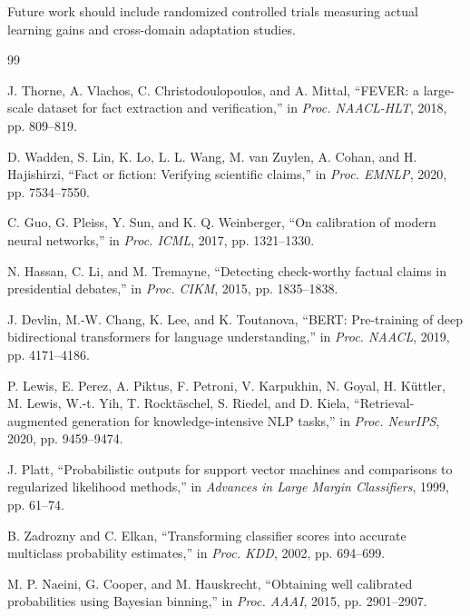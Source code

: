 \documentclass[journal]{IEEEtran}
\begin{document}
Future work should include randomized controlled trials measuring actual learning gains and cross-domain adaptation studies.


\begin{thebibliography}{99}

J. Thorne, A. Vlachos, C. Christodoulopoulos, and A. Mittal, ``FEVER: a large-scale dataset for fact extraction and verification,'' in \textit{Proc. NAACL-HLT}, 2018, pp. 809--819.

D. Wadden, S. Lin, K. Lo, L. L. Wang, M. van Zuylen, A. Cohan, and H. Hajishirzi, ``Fact or fiction: Verifying scientific claims,'' in \textit{Proc. EMNLP}, 2020, pp. 7534--7550.

C. Guo, G. Pleiss, Y. Sun, and K. Q. Weinberger, ``On calibration of modern neural networks,'' in \textit{Proc. ICML}, 2017, pp. 1321--1330.

N. Hassan, C. Li, and M. Tremayne, ``Detecting check-worthy factual claims in presidential debates,'' in \textit{Proc. CIKM}, 2015, pp. 1835--1838.

J. Devlin, M.-W. Chang, K. Lee, and K. Toutanova, ``BERT: Pre-training of deep bidirectional transformers for language understanding,'' in \textit{Proc. NAACL}, 2019, pp. 4171--4186.

P. Lewis, E. Perez, A. Piktus, F. Petroni, V. Karpukhin, N. Goyal, H. K{\"u}ttler, M. Lewis, W.-t. Yih, T. Rockt{\"a}schel, S. Riedel, and D. Kiela, ``Retrieval-augmented generation for knowledge-intensive NLP tasks,'' in \textit{Proc. NeurIPS}, 2020, pp. 9459--9474.

J. Platt, ``Probabilistic outputs for support vector machines and comparisons to regularized likelihood methods,'' in \textit{Advances in Large Margin Classifiers}, 1999, pp. 61--74.

B. Zadrozny and C. Elkan, ``Transforming classifier scores into accurate multiclass probability estimates,'' in \textit{Proc. KDD}, 2002, pp. 694--699.

M. P. Naeini, G. Cooper, and M. Hauskrecht, ``Obtaining well calibrated probabilities using Bayesian binning,'' in \textit{Proc. AAAI}, 2015, pp. 2901--2907.


\end{thebibliography}
\end{document}

